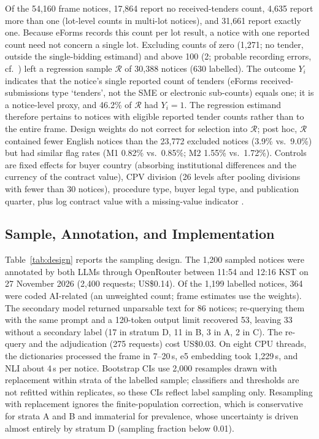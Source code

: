 \documentclass[runningheads]{llncs}
\begin{document}
Of the 54,160 frame notices, 17,864 report no received-tenders count, 4,635 report more than one (lot-level counts in multi-lot notices), and 31,661 report exactly one. Because eForms records this count per lot result, a notice with one reported count need not concern a single lot. Excluding counts of zero (1,271; no tender, outside the single-bidding estimand) and above 100 (2; probable recording errors, cf.\ \cite{potin2023}) left a regression sample $\mathcal{R}$ of 30,388 notices (630 labelled). The outcome $Y_i$ indicates that the notice's single reported count of tenders (eForms received-submissions type `tenders', not the SME or electronic sub-counts) equals one; it is a notice-level proxy, and 46.2\% of $\mathcal{R}$ had $Y_i=1$. The regression estimand therefore pertains to notices with eligible reported tender counts rather than to the entire frame. Design weights do not correct for selection into $\mathcal{R}$; post hoc, $\mathcal{R}$ contained fewer English notices than the 23,772 excluded notices (3.9\% vs.\ 9.0\%) but had similar flag rates (M1 0.82\% vs.\ 0.85\%; M2 1.55\% vs.\ 1.72\%). Controls are fixed effects for buyer country (absorbing institutional differences and the currency of the contract value), CPV division (26 levels after pooling divisions with fewer than 30 notices), procedure type, buyer legal type, and publication quarter, plus log contract value with a missing-value indicator \cite{fazekas2016,decarolis2022}.

\subsection{Sample, Annotation, and Implementation}
Table~\ref{tab:design} reports the sampling design. The 1,200 sampled notices were annotated by both LLMs through OpenRouter between 11:54 and 12:16 KST on 27 November 2026 (2,400 requests; US\$0.14). Of the 1,199 labelled notices, 364 were coded AI-related (an unweighted count; frame estimates use the weights). The secondary model returned unparsable text for 86 notices; re-querying them with the same prompt and a 120-token output limit recovered 53, leaving 33 without a secondary label (17 in stratum D, 11 in B, 3 in A, 2 in C). The re-query and the adjudication (275 requests) cost US\$0.03. On eight CPU threads, the dictionaries processed the frame in 7--20\,s, e5 embedding took 1,229\,s, and NLI about 4\,s per notice. Bootstrap CIs use 2,000 resamples drawn with replacement within strata of the labelled sample; classifiers and thresholds are not refitted within replicates, so these CIs reflect label sampling only. Resampling with replacement ignores the finite-population correction, which is conservative for strata A and B and immaterial for prevalence, whose uncertainty is driven almost entirely by stratum D (sampling fraction below 0.01).
\end{document}
